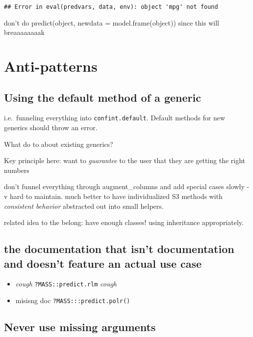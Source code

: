 \documentclass[]{book}
\providecommand{\tightlist}{%
  \setlength{\itemsep}{0pt}\setlength{\parskip}{0pt}}
\theoremstyle{definition}
\theoremstyle{definition}
\theoremstyle{definition}
\theoremstyle{remark}
\begin{document}
\begin{verbatim}
## Error in eval(predvars, data, env): object 'mpg' not found
\end{verbatim}

don't do predict(object, newdata = model.frame(object)) since this will
breaaaaaaaak

\section{Anti-patterns}\label{anti-patterns}

\subsection{Using the default method of a
generic}\label{using-the-default-method-of-a-generic}

i.e.~funneling everything into \texttt{confint.default}. Default methods
for new generics should throw an error.

What do to about existing generics?

Key principle here: want to \emph{guarantee} to the user that they are
getting the right numbers

don't funnel everything through augment\_columns and add special cases
slowly - v hard to maintain. much better to have individualized S3
methods with \emph{consistent behavior} abstracted out into small
helpers.

related idea to the belong: have enough classes! using inheritance
appropriately.

\subsection{the documentation that isn't documentation and doesn't
feature an actual use
case}\label{the-documentation-that-isnt-documentation-and-doesnt-feature-an-actual-use-case}

\begin{itemize}
\tightlist
\item
  \emph{cough} \texttt{?MASS::predict.rlm} \emph{cough}
\item
  misisng doc \texttt{?MASS:::predict.polr()}
\end{itemize}

\subsection{Never use missing
arguments}\label{never-use-missing-arguments}
\end{document}
